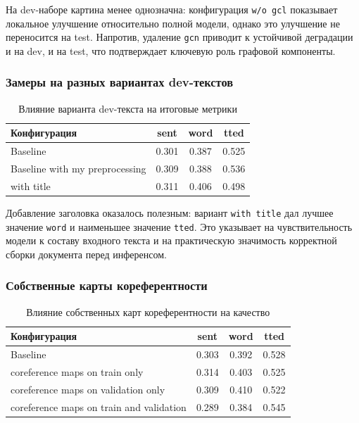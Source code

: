 \documentclass[12pt,a4paper]{article}
\begin{document}
На dev-наборе картина менее однозначна: конфигурация \texttt{w/o gcl} показывает локальное улучшение относительно полной модели, однако это улучшение не переносится на test. Напротив, удаление \texttt{gcn} приводит к устойчивой деградации и на dev, и на test, что подтверждает ключевую роль графовой компоненты.

\subsubsection{Замеры на разных вариантах dev-текстов}

\begin{table}[H]
\centering
\caption{Влияние варианта dev-текста на итоговые метрики}
\begin{tabular}{lccc}
\toprule
Конфигурация & sent & word & tted \\
\midrule
Baseline & 0.301 & 0.387 & 0.525 \\
Baseline with my preprocessing & 0.309 & 0.388 & 0.536 \\
with title & 0.311 & 0.406 & 0.498 \\
\bottomrule
\end{tabular}
\end{table}

Добавление заголовка оказалось полезным: вариант \texttt{with title} дал лучшее значение \texttt{word} и наименьшее значение \texttt{tted}. Это указывает на чувствительность модели к составу входного текста и на практическую значимость корректной сборки документа перед инференсом.

\subsubsection{Собственные карты кореферентности}

\begin{table}[H]
\centering
\caption{Влияние собственных карт кореферентности на качество}
\begin{tabular}{lccc}
\toprule
Конфигурация & sent & word & tted \\
\midrule
Baseline & 0.303 & 0.392 & 0.528 \\
coreference maps on train only & 0.314 & 0.403 & 0.525 \\
coreference maps on validation only & 0.309 & 0.410 & 0.522 \\
coreference maps on train and validation & 0.289 & 0.384 & 0.545 \\
\bottomrule
\end{tabular}
\end{table}
\end{document}
